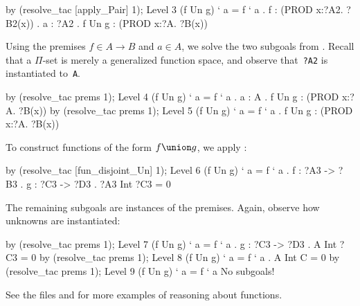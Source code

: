\begin{ttbox}
by (resolve_tac [apply_Pair] 1);
{\out Level 3}
{\out (f Un g) ` a = f ` a}
{. f : (PROD x:?A2. ?B2(x))}
{. a : ?A2}
{. f Un g : (PROD x:?A. ?B(x))}
\end{ttbox}
Using the premises $f\in A\to B$ and $a\in A$, we solve the two subgoals
from .  Recall that a $\Pi$-set is merely a generalized
function space, and observe that~{\tt?A2} is instantiated to~{\tt A}.
\begin{ttbox}
by (resolve_tac prems 1);
{\out Level 4}
{\out (f Un g) ` a = f ` a}
{. a : A}
{. f Un g : (PROD x:?A. ?B(x))}
by (resolve_tac prems 1);
{\out Level 5}
{\out (f Un g) ` a = f ` a}
{. f Un g : (PROD x:?A. ?B(x))}
\end{ttbox}
To construct functions of the form $f\union g$, we apply
:
\begin{ttbox}
by (resolve_tac [fun_disjoint_Un] 1);
{\out Level 6}
{\out (f Un g) ` a = f ` a}
{. f : ?A3 -> ?B3}
{. g : ?C3 -> ?D3}
{. ?A3 Int ?C3 = 0}
\end{ttbox}
The remaining subgoals are instances of the premises.  Again, observe how
unknowns are instantiated:
\begin{ttbox}
by (resolve_tac prems 1);
{\out Level 7}
{\out (f Un g) ` a = f ` a}
{. g : ?C3 -> ?D3}
{. A Int ?C3 = 0}
by (resolve_tac prems 1);
{\out Level 8}
{\out (f Un g) ` a = f ` a}
{. A Int C = 0}
by (resolve_tac prems 1);
{\out Level 9}
{\out (f Un g) ` a = f ` a}
{\out No subgoals!}
\end{ttbox}
See the files  and  for more
examples of reasoning about functions.
